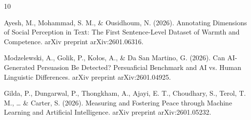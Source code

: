 \documentclass[11pt]{article}
\begin{document}
\begin{thebibliography}{10}

 Ayesh, M., Mohammad, S. M., \& Ousidhoum, N. (2026). Annotating Dimensions of Social Perception in Text: The First Sentence-Level Dataset of Warmth and Competence. arXiv preprint arXiv:2601.06316.

 Modzelewski, A., Golik, P., Kołos, A., \& Da San Martino, G. (2026). Can AI-Generated Persuasion Be Detected? Persuaficial Benchmark and AI vs. Human Linguistic Differences. arXiv preprint arXiv:2601.04925.

 Gilda, P., Dungarwal, P., Thongkham, A., Ajayi, E. T., Choudhary, S., Terol, T. M., \ldots{} \& Carter, S. (2026). Measuring and Fostering Peace through Machine Learning and Artificial Intelligence. arXiv preprint arXiv:2601.05232.

\end{thebibliography}
\end{document}
